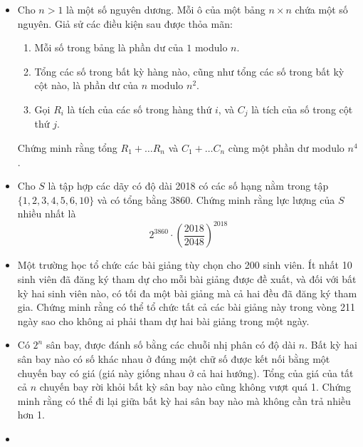 \documentclass[11pt]{scrartcl}
\begin{document}
\begin{itemize}[label=, leftmargin=0em, itemsep=-0em]
\begin{btvn}
    \end{btvn}
    \item \begin{btvn}
        Cho $n>1$ là một số nguyên dương. Mỗi ô của một bảng $n\times n$ chứa một số nguyên. Giả sử các điều kiện sau được thỏa mãn:
        \begin{enumerate}
            \item Mỗi số trong bảng là phần dư của $1$ modulo $n$.
            \item Tổng các số trong bất kỳ hàng nào, cũng như tổng các số trong bất kỳ cột nào, là phần dư của $n$ modulo $n^2$.
            \item Gọi $R_i$ là tích của các số trong hàng thứ $i$, và $C_j$ là tích của số trong cột thứ $j$.
        \end{enumerate}
         Chứng minh rằng tổng $R_1+\hdots R_n$ và $C_1+\hdots C_n$ cùng một phần dư modulo $n^4$.
    \end{btvn}
    \item \begin{btvn}
        Cho $S$ là tập hợp các dãy có độ dài 2018 có các số hạng nằm trong tập $\{1, 2, 3, 4, 5, 6, 10\}$ và có tổng bằng 3860. Chứng minh rằng lực lượng của $S$ nhiều nhất là
        \[2^{3860} \cdot \left(\frac{2018}{2048}\right)^{2018}\]
    \end{btvn}
    \item \begin{btvn}
        Một trường học tổ chức các bài giảng tùy chọn cho 200 sinh viên. Ít nhất 10 sinh viên đã đăng ký tham dự cho mỗi bài giảng được đề xuất, và đối với bất kỳ hai sinh viên nào, có tối đa một bài giảng mà cả hai đều đã đăng ký tham gia. Chứng minh rằng có thể tổ chức tất cả các bài giảng này trong vòng 211 ngày sao cho không ai phải tham dự hai bài giảng trong một ngày.
    \end{btvn}
    \item \begin{btvn}
        Có $2^n$ sân bay, được đánh số bằng các chuỗi nhị phân có độ dài $n$. Bất kỳ hai sân bay nào có số khác nhau ở đúng một chữ số được kết nối bằng một chuyến bay có giá (giá này giống nhau ở cả hai hướng). Tổng của giá của tất cả $n$ chuyến bay rời khỏi bất kỳ sân bay nào cũng không vượt quá 1. Chứng minh rằng có thể đi lại giữa bất kỳ hai sân bay nào mà không cần trả nhiều hơn 1.
    \end{btvn}
    \item \begin{btvn}

\end{btvn}
\end{itemize}
\end{document}
